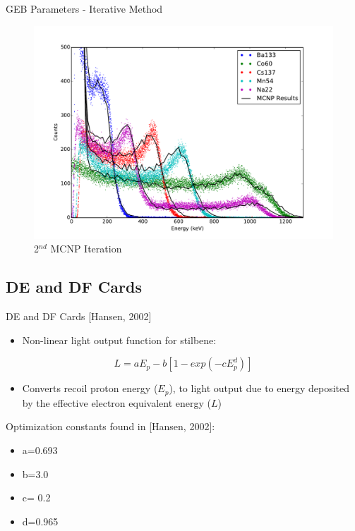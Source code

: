 \documentclass{beamer}
\begin{document}
\begin{frame}{GEB Parameters - Iterative Method}
\begin{figure}
\vspace{-0.25cm}
\begin{center}
\includegraphics[scale = 0.35]{MCNP_Comparison_2cal}
\vspace{-0.4cm}
\caption{\scriptsize{2$^{nd}$ MCNP Iteration}}
\end{center}
\end{figure}
\end{frame}

\subsection{DE and DF Cards}
\begin{frame}{DE and DF Cards [Hansen, 2002]}
\vspace*{-0.3cm}
\begin{itemize}
\item Non-linear light output function for stilbene:
\end{itemize}
  \begin{equation} \label{Light_output}
  L = aE_p - b[1-exp(-cE_p^d)]
  \end{equation}
 \vspace*{-0.3cm}
\begin{itemize}
\item Converts recoil proton energy ($E_p$), to light output due to energy deposited by the effective electron equivalent energy ($L$)
\end{itemize}
\begin{block}{Optimization constants found in [Hansen, 2002]:}
\begin{itemize}
\item a=0.693
\item b=3.0
\item c= 0.2
\item d=0.965
\end{itemize}
\end{block}
\end{frame}
\end{document}
